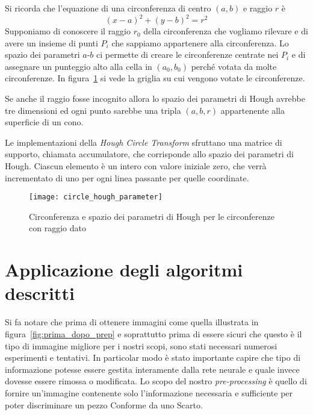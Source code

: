 Si ricorda che l'equazione di una circonferenza di centro $(a,b)$ e raggio $r$ è
\begin{equation} \label{eq:circonferenza}
  (x - a)^2 + (y - b)^2 = r^2
\end{equation}
Supponiamo di conoscere il raggio $r_0$ della circonferenza che vogliamo rilevare e di avere un insieme di punti $P_i$ che sappiamo appartenere alla circonferenza.
Lo spazio dei parametri $a$-$b$ ci permette di creare le circonferenze centrate nei $P_i$ e di assegnare un punteggio alto alla cella in $(a_0,b_0)$ perché votata da molte circonferenze.
In figura~\ref{fig:hough_parametr_circ} si vede la griglia su cui vengono votate le circonferenze.

Se anche il raggio fosse incognito allora lo spazio dei parametri di Hough avrebbe tre dimensioni ed ogni punto sarebbe una tripla $(a,b,r)$ appartenente alla superficie di un cono.

Le implementazioni della \textit{Hough Circle Transform} sfruttano una matrice di supporto, chiamata accumulatore, che corrisponde allo spazio dei parametri di Hough.
Ciascun elemento è un intero con valore iniziale zero, che verrà incrementato di uno per ogni linea passante per quelle coordinate.
\begin{figure}[ht]
  \begin{center}
      \texttt{[image: circle\_hough\_parameter]}
      \caption{Circonferenza e spazio dei parametri di Hough per le circonferenze con raggio dato}
      \label{fig:hough_parametr_circ}
  \end{center}
\end{figure}



\clearpage
\section {Applicazione degli algoritmi descritti} \label{prep}
Si fa notare che prima di ottenere immagini come quella illustrata in figura~\ref{fig:prima_dopo_prep} e soprattutto prima di essere sicuri che questo è il tipo di immagine migliore per i nostri scopi, sono stati necessari numerosi esperimenti e tentativi.
In particolar modo è stato importante capire che tipo di informazione potesse essere gestita interamente dalla rete neurale e quale invece dovesse essere rimossa o modificata.
Lo scopo del nostro \textit{pre-processing} è quello di fornire un'immagine contenente solo l'informazione necessaria e sufficiente per poter discriminare un pezzo Conforme da uno Scarto.

